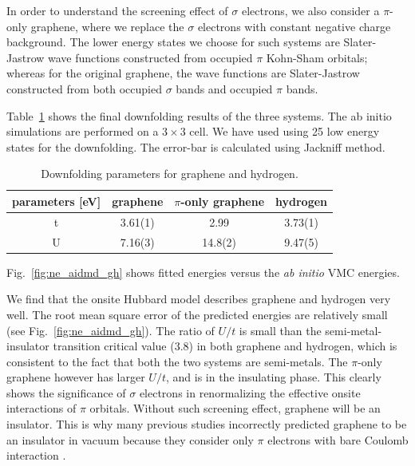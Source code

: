 \documentclass[prl,12pt,onecolumn,nofootinbib,notitlepage,english,superscriptaddress]{revtex4-1}
\begin{document}
In order to understand the screening effect of $\sigma$ electrons, we also consider a $\pi$-only graphene, where we replace the $\sigma$ electrons with constant negative charge background. The lower energy states we choose for such systems are Slater-Jastrow wave functions constructed from occupied $\pi$ Kohn-Sham orbitals; whereas for the original graphene, the wave functions are Slater-Jastrow constructed from both occupied $\sigma$ bands and occupied $\pi$ bands. 

Table~\ref{tab:grpheffm} shows the final downfolding results of the three systems. The ab initio simulations are performed on a $3\times3$ cell. We have used using 25 low energy states for the downfolding. The error-bar is calculated using Jackniff method. 

\begin{table}[ht]
\label{tab:grpheffm}
\centering
\begin{tabular}{|c|c|c|c|}
\hline
parameters [eV] & graphene & $\pi$-only graphene &hydrogen \\
\hline
\hline
t & 3.61(1) & 2.99 & 3.73(1)\\
U & 7.16(3) & 14.8(2) & 9.47(5)\\
\hline
\end{tabular}
\caption{Downfolding parameters for graphene and hydrogen.}
\end{table} 
Fig.~\ref{fig:ne_aidmd_gh} shows fitted energies versus the \textit{ab initio} VMC energies. 

We find that the onsite Hubbard model describes graphene and hydrogen very well. The root mean square error of the predicted energies are relatively small (see Fig.~\ref{fig:ne_aidmd_gh}). The ratio of $U/t$ is small than the semi-metal-insulator transition critical value (3.8) in both graphene and hydrogen, which is consistent to the fact that both the two systems are semi-metals.  The $\pi$-only graphene however has larger $U/t$, and is in the insulating phase. This clearly shows the significance of $\sigma$ electrons in renormalizing the effective onsite interactions of $\pi$ orbitals. Without such screening effect, graphene will be an insulator. This is why many previous studies incorrectly predicted graphene to be an insulator in vacuum because they consider only $\pi$ electrons with bare Coulomb interaction \cite{DrutPRL2009, DrutPRB2009,  Smith2014}.
\end{document}
